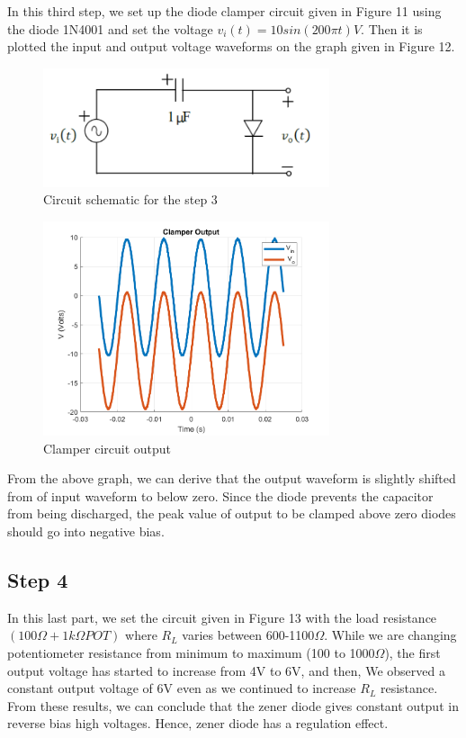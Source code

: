 \documentclass[letterpaper,12pt]{article}
\begin{document}
In this third step, we set up the diode clamper circuit given in Figure 11 using the diode 1N4001 and set the voltage \(v_i(t) = 10sin(200\pi t) V\). Then it is plotted the input and output voltage waveforms on the graph given in Figure 12.

\begin{figure}[H]
    \centering
    \includegraphics[width = 0.75\textwidth]{3_1.png}
    \caption{Circuit schematic for the step 3}
\end{figure} 
    

\begin{figure}[H]
    \centering
    \includegraphics[width = 0.75\textwidth]{3.png}
    \caption{Clamper circuit output }
\end{figure} 
    
From the above graph, we can derive that the output waveform is slightly shifted from of input waveform to below zero. Since the diode prevents the capacitor from being discharged, the peak value of output to be clamped above zero diodes should go into negative bias.



\subsection{Step 4}

In this last part, we set the circuit given in Figure 13 with the load resistance \( (100\Omega+1k\Omega POT) \) where \(R_L\) varies between 600-1100\(\Omega\). While we are changing potentiometer resistance from minimum to maximum (100 to 1000\(\Omega\)), the first output voltage has started to increase from 4V to 6V, and then, We observed a constant output voltage of 6V even as we continued to increase \(R_L\) resistance. From these results, we can conclude that the zener diode gives constant output in reverse bias high voltages. Hence, zener diode has a regulation effect. 
\end{document}
